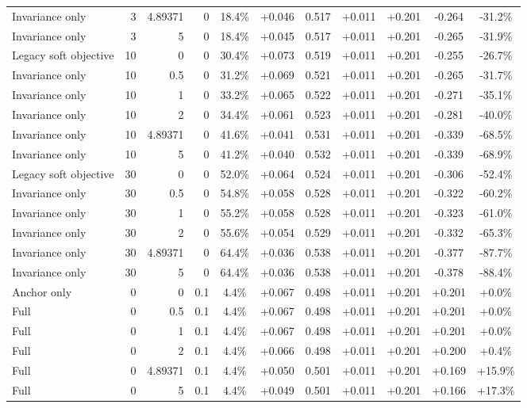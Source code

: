 \begin{table}[htbp]
\begin{tabular}{lrrrccccccc}
Invariance only & 3 & 4.89371 & 0 & 18.4\% & +0.046 & 0.517 & +0.011 & +0.201 & -0.264 & -31.2\% \\
Invariance only & 3 & 5 & 0 & 18.4\% & +0.045 & 0.517 & +0.011 & +0.201 & -0.265 & -31.9\% \\
Legacy soft objective & 10 & 0 & 0 & 30.4\% & +0.073 & 0.519 & +0.011 & +0.201 & -0.255 & -26.7\% \\
Invariance only & 10 & 0.5 & 0 & 31.2\% & +0.069 & 0.521 & +0.011 & +0.201 & -0.265 & -31.7\% \\
Invariance only & 10 & 1 & 0 & 33.2\% & +0.065 & 0.522 & +0.011 & +0.201 & -0.271 & -35.1\% \\
Invariance only & 10 & 2 & 0 & 34.4\% & +0.061 & 0.523 & +0.011 & +0.201 & -0.281 & -40.0\% \\
Invariance only & 10 & 4.89371 & 0 & 41.6\% & +0.041 & 0.531 & +0.011 & +0.201 & -0.339 & -68.5\% \\
Invariance only & 10 & 5 & 0 & 41.2\% & +0.040 & 0.532 & +0.011 & +0.201 & -0.339 & -68.9\% \\
Legacy soft objective & 30 & 0 & 0 & 52.0\% & +0.064 & 0.524 & +0.011 & +0.201 & -0.306 & -52.4\% \\
Invariance only & 30 & 0.5 & 0 & 54.8\% & +0.058 & 0.528 & +0.011 & +0.201 & -0.322 & -60.2\% \\
Invariance only & 30 & 1 & 0 & 55.2\% & +0.058 & 0.528 & +0.011 & +0.201 & -0.323 & -61.0\% \\
Invariance only & 30 & 2 & 0 & 55.6\% & +0.054 & 0.529 & +0.011 & +0.201 & -0.332 & -65.3\% \\
Invariance only & 30 & 4.89371 & 0 & 64.4\% & +0.036 & 0.538 & +0.011 & +0.201 & -0.377 & -87.7\% \\
Invariance only & 30 & 5 & 0 & 64.4\% & +0.036 & 0.538 & +0.011 & +0.201 & -0.378 & -88.4\% \\
Anchor only & 0 & 0 & 0.1 & 4.4\% & +0.067 & 0.498 & +0.011 & +0.201 & +0.201 & +0.0\% \\
Full & 0 & 0.5 & 0.1 & 4.4\% & +0.067 & 0.498 & +0.011 & +0.201 & +0.201 & +0.0\% \\
Full & 0 & 1 & 0.1 & 4.4\% & +0.067 & 0.498 & +0.011 & +0.201 & +0.201 & +0.0\% \\
Full & 0 & 2 & 0.1 & 4.4\% & +0.066 & 0.498 & +0.011 & +0.201 & +0.200 & +0.4\% \\
Full & 0 & 4.89371 & 0.1 & 4.4\% & +0.050 & 0.501 & +0.011 & +0.201 & +0.169 & +15.9\% \\
Full & 0 & 5 & 0.1 & 4.4\% & +0.049 & 0.501 & +0.011 & +0.201 & +0.166 & +17.3\% \\

\end{tabular}
\end{table}
